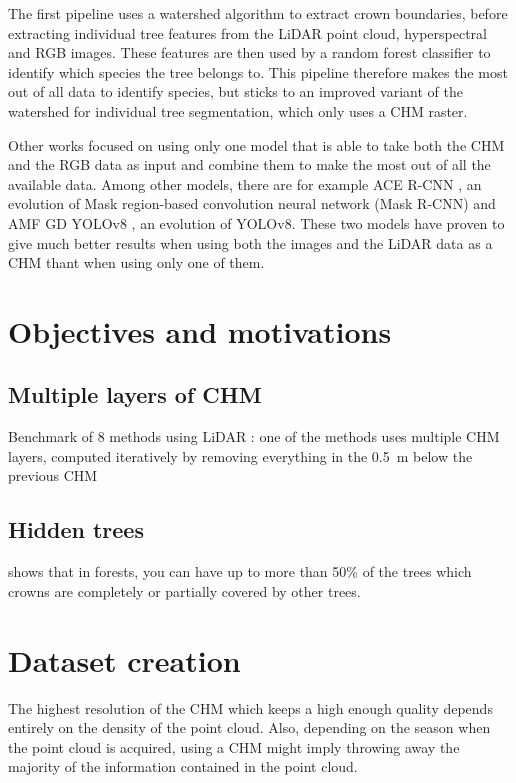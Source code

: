 \documentclass[
]{report}
\begin{document}
The first pipeline \autocite{lidar_rgb_wst} uses a watershed algorithm
to extract crown boundaries, before extracting individual tree features
from the LiDAR point cloud, hyperspectral and RGB images. These features
are then used by a random forest classifier to identify which species
the tree belongs to. This pipeline therefore makes the most out of all
data to identify species, but sticks to an improved variant of the
watershed for individual tree segmentation, which only uses a CHM
raster.

Other works focused on using only one model that is able to take both
the CHM and the RGB data as input and combine them to make the most out
of all the available data. Among other models, there are for example ACE
R-CNN \autocite{lidar_rgb_acnet}, an evolution of Mask region-based
convolution neural network (Mask R-CNN) and AMF GD YOLOv8
\autocite{amf_gd_yolov8}, an evolution of YOLOv8. These two models have
proven to give much better results when using both the images and the
LiDAR data as a CHM thant when using only one of them.

\chapter{Objectives and motivations}\label{objectives-and-motivations}

\section{Multiple layers of CHM}\label{multiple-layers-of-chm}

Benchmark of 8 methods using LiDAR \autocite{lidar_benchmark}: one of
the methods uses multiple CHM layers, computed iteratively by removing
everything in the 0.5~m below the previous CHM

\section{Hidden trees}\label{hidden-trees}

\autocite{lidar_benchmark_2} shows that in forests, you can have up to
more than 50\% of the trees which crowns are completely or partially
covered by other trees.

\chapter{Dataset creation}\label{sec-dataset}

The highest resolution of the CHM which keeps a high enough quality
depends entirely on the density of the point cloud. Also, depending on
the season when the point cloud is acquired, using a CHM might imply
throwing away the majority of the information contained in the point
cloud.
\end{document}
